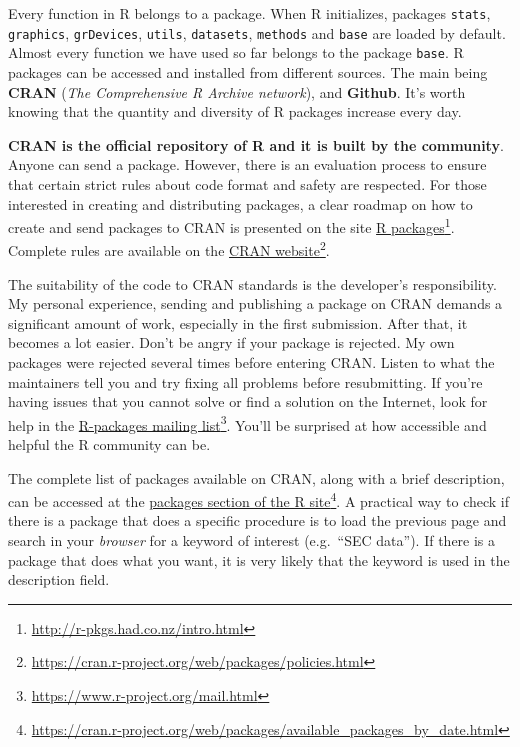 \documentclass[
  12pt,
]{book}
\begin{document}
Every function in R belongs to a package. When R initializes, packages \texttt{stats}, \texttt{graphics}, \texttt{grDevices}, \texttt{utils}, \texttt{datasets}, \texttt{methods} and \texttt{base} are loaded by default. Almost every function we have used so far belongs to the package \texttt{base}. R packages can be accessed and installed from different sources. The main being \textbf{CRAN} (\emph{The Comprehensive R Archive network}), and \textbf{Github}. It's worth knowing that the quantity and diversity of R packages increase every day.

\textbf{CRAN is the official repository of R and it is built by the community}. Anyone can send a package. However, there is an evaluation process to ensure that certain strict rules about code format and safety are respected. For those interested in creating and distributing packages, a clear roadmap on how to create and send packages to CRAN is presented on the site \href{http://r-pkgs.had.co.nz/intro.html}{R packages}\footnote{\url{http://r-pkgs.had.co.nz/intro.html}}. Complete rules are available on the \href{https://cran.r-project.org/web/packages/policies.html}{CRAN website}\footnote{\url{https://cran.r-project.org/web/packages/policies.html}}.

The suitability of the code to CRAN standards is the developer's responsibility. My personal experience, sending and publishing a package on CRAN demands a significant amount of work, especially in the first submission. After that, it becomes a lot easier. Don't be angry if your package is rejected. My own packages were rejected several times before entering CRAN. Listen to what the maintainers tell you and try fixing all problems before resubmitting. If you're having issues that you cannot solve or find a solution on the Internet, look for help in the \href{https://www.r-project.org/mail.html}{R-packages mailing list}\footnote{\url{https://www.r-project.org/mail.html}}. You'll be surprised at how accessible and helpful the R community can be.

The complete list of packages available on CRAN, along with a brief description, can be accessed at the \href{https://cran.r-project.org/web/packages/available_packages_by_date.html}{packages section of the R site}\footnote{\url{https://cran.r-project.org/web/packages/available_packages_by_date.html}}. A practical way to check if there is a package that does a specific procedure is to load the previous page and search in your \emph{browser} for a keyword of interest (e.g.~``SEC data''). If there is a package that does what you want, it is very likely that the keyword is used in the description field.
\end{document}
